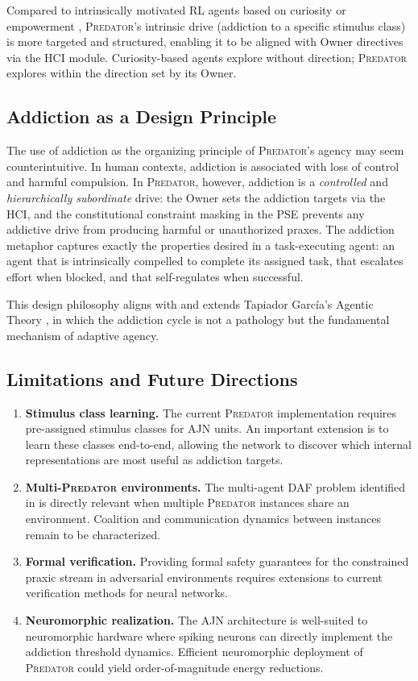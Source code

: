 \documentclass[12pt,a4paper]{article}
\newcommand{\PREDATOR}{\textsc{Predator}}
\begin{document}
Compared to intrinsically motivated RL agents based on curiosity
\cite{pathak2017curiosity} or empowerment \cite{klyubin2005empowerment},
\PREDATOR's intrinsic drive (addiction to a specific stimulus class) is more
targeted and structured, enabling it to be aligned with Owner directives
via the HCI module. Curiosity-based agents explore without direction;
\PREDATOR{} explores within the direction set by its Owner.

\subsection{Addiction as a Design Principle}

The use of addiction as the organizing principle of \PREDATOR's agency may
seem counterintuitive. In human contexts, addiction is associated with loss
of control and harmful compulsion. In \PREDATOR, however, addiction is a
\textit{controlled} and \textit{hierarchically subordinate} drive: the Owner
sets the addiction targets via the HCI, and the constitutional constraint
masking in the PSE prevents any addictive drive from producing harmful or
unauthorized praxes. The addiction metaphor captures exactly the properties
desired in a task-executing agent: an agent that is intrinsically compelled
to complete its assigned task, that escalates effort when blocked, and that
self-regulates when successful.

This design philosophy aligns with and extends Tapiador Garc\'ia's Agentic
Theory \cite{tapiador2024ajn}, in which the addiction cycle is not a pathology
but the fundamental mechanism of adaptive agency.

\subsection{Limitations and Future Directions}

\begin{enumerate}
  \item \textbf{Stimulus class learning.} The current \PREDATOR{} implementation
    requires pre-assigned stimulus classes for AJN units. An important extension
    is to learn these classes end-to-end, allowing the network to discover
    which internal representations are most useful as addiction targets.
  \item \textbf{Multi-\PREDATOR{} environments.} The multi-agent DAF problem
    identified in \cite{tapiador2024daf} is directly relevant when multiple
    \PREDATOR{} instances share an environment. Coalition and communication
    dynamics between instances remain to be characterized.
  \item \textbf{Formal verification.} Providing formal safety guarantees for
    the constrained praxic stream in adversarial environments requires
    extensions to current verification methods for neural networks.
  \item \textbf{Neuromorphic realization.} The AJN architecture is
    well-suited to neuromorphic hardware where spiking neurons can directly
    implement the addiction threshold dynamics. Efficient neuromorphic
    deployment of \PREDATOR{} could yield order-of-magnitude energy reductions.
\end{enumerate}
\end{document}
